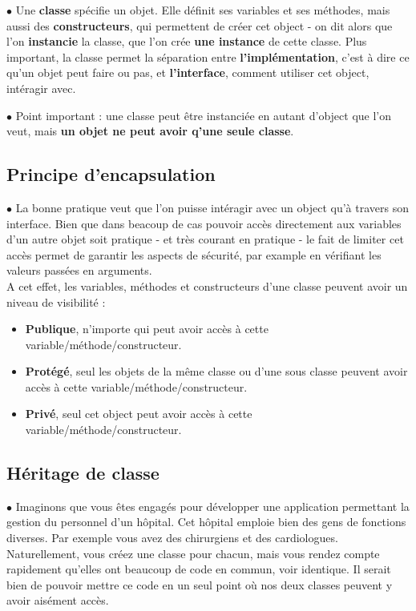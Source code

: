 \par $\bullet$ Une \textbf{classe} spécifie un objet. Elle définit ses variables et ses méthodes, mais aussi des \textbf{constructeurs}, qui permettent de créer cet object - on dit alors que l'on \textbf{instancie} la classe, que l'on crée \textbf{une instance} de cette classe. Plus important, la classe permet la séparation entre \textbf{l'implémentation}, c'est à dire ce qu'un objet peut faire ou pas, et \textbf{l'interface}, comment utiliser cet object, intéragir avec.

\par $\bullet$ Point important : une classe peut être instanciée en autant d'object que l'on veut, mais \textbf{un objet ne peut avoir q'une seule classe}.

\subsection{Principe d'encapsulation}
\par $\bullet$ La bonne pratique veut que l'on puisse intéragir avec un object qu'à travers son interface. Bien que dans beacoup de cas pouvoir accès directement aux variables d'un autre objet soit pratique - et très courant en pratique - le fait de limiter cet accès permet de garantir les aspects de sécurité, par example en vérifiant les valeurs passées en arguments.\\

A cet effet, les variables, méthodes et constructeurs d'une classe peuvent avoir un niveau de visibilité :
\begin{itemize}
  \item \textbf{Publique}, n'importe qui peut avoir accès à cette variable/méthode/constructeur.
  \item \textbf{Protégé}, seul les objets de la même classe ou d'une sous classe peuvent avoir accès à cette variable/méthode/constructeur.
  \item \textbf{Privé}, seul cet object peut avoir accès à cette variable/méthode/constructeur.
\end{itemize}

\newpage
\subsection{Héritage de classe}
\par $\bullet$ Imaginons que vous êtes engagés pour développer une application permettant la gestion du personnel d'un hôpital. Cet hôpital emploie bien des gens de fonctions diverses. Par exemple vous avez des chirurgiens et des cardiologues. Naturellement, vous créez une classe pour chacun, mais vous rendez compte rapidement qu'elles ont beaucoup de code en commun, voir identique. Il serait bien de pouvoir mettre ce code en un seul point où nos deux classes peuvent y avoir aisément accès.\\


